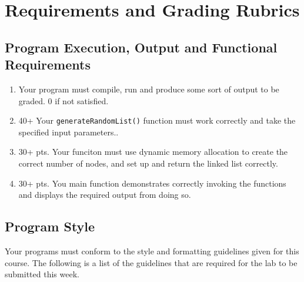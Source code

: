 \documentclass[11pt]{article}
\begin{document}
\section*{Requirements and Grading Rubrics}
\label{sec-5}
\subsection*{Program Execution, Output and Functional Requirements}
\label{sec-5-1}


\begin{enumerate}
\item Your program must compile, run and produce some sort of output to be
  graded. 0 if not satisfied.
\item 40+ Your \verb~generateRandomList()~ function must work correctly and take the
   specified input parameters..
\item 30+ pts.  Your funciton must use dynamic memory allocation to create the
   correct number of nodes, and set up and return the linked list correctly.
\item 30+ pts. You main function demonstrates correctly invoking the functions
   and displays the required output from doing so.
\end{enumerate}
\subsection*{Program Style}
\label{sec-5-2}


Your programs must conform to the style and formatting guidelines given for this course.
The following is a list of the guidelines that are required for the lab to be submitted
this week.
\end{document}
